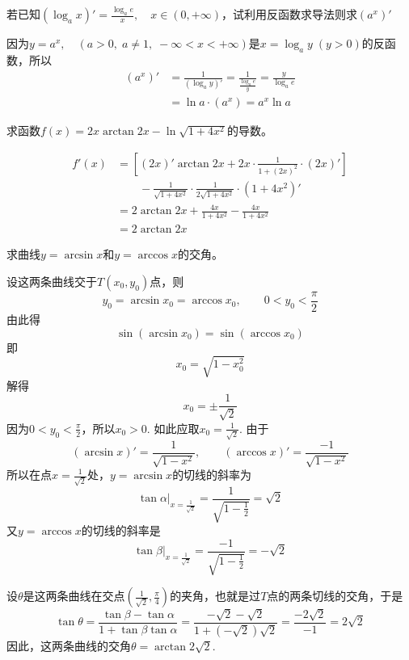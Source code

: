 \begin{example}
若已知$(\log_a x)'=\frac{\log_a e}{x},\quad x\in(0,+\infty)$，试利用反函数求导法则求$(a^x)'$    
\end{example}

\begin{solution}
    因为$y=a^x,\quad (a>0,\; a\ne 1,\; -\infty<x<+\infty)$是$x=\log_a y\; (y>0)$的反函数，所以
\[\begin{split}
    (a^x)'&=\frac{1}{(\log_a y)'}=\frac{1}{\frac{\log_a e}{y}}=\frac{y}{\log_a e}\\
    &=\ln a\cdot (a^x)=a^x\ln a
\end{split}\]
\end{solution}

\begin{example}
求函数$f(x)=2x\arctan 2x-\ln\sqrt{1+4x^2}$的导数。
\end{example}

\begin{solution}
\[\begin{split}
    f'(x)&=\left[(2x)'\arctan 2x+2x\cdot \frac{1}{1+(2x)^2}\cdot (2x)'\right]\\
    &\qquad -\frac{1}{\sqrt{1+4x^2}}\cdot \frac{1}{2\sqrt{1+4x^2}}\cdot (1+4x^2)'\\
    &=2\arctan 2x+\frac{4x}{1+4x^2}-\frac{4x}{1+4x^2}\\
    &=2\arctan 2x
\end{split}\]
\end{solution}


\begin{example}
求曲线$y=\arcsin x$和$y=\arccos x$的交角。
\end{example}

\begin{solution}
设这两条曲线交于$T(x_0,y_0)$点，则
\[y_0=\arcsin x_0=\arccos x_0,\qquad 0<y_0<\frac{\pi}{2}\]
  由此得
\begin{equation}
    \sin(\arcsin x_0)=\sin(\arccos x_0)
\end{equation}  
即
\[x_0=\sqrt{1-x^2_0}\]
解得
\[x_0=\pm\frac{1}{\sqrt{2}}\]
因为$0<y_0<\frac{\pi}{2}$，所以$x_0>0$. 如此应取$x_0=\frac{1}{\sqrt{2}}$. 由于
\[(\arcsin x)'=\frac{1}{\sqrt{1-x^2}},\qquad (\arccos x)'=\frac{-1}{\sqrt{1-x^2}}\]
所以在点$x=\frac{1}{\sqrt{2}}$处，$y=\arcsin x$的切线的斜率为
\[\tan\alpha\Big|_{x=\tfrac{1}{\sqrt{2}}}=\frac{1}{\sqrt{1-\frac{1}{2}}}=\sqrt{2}\]
又$y=\arccos x$的切线的斜率是
\[\tan\beta\Big|_{x=\tfrac{1}{\sqrt{2}}}=\frac{-1}{\sqrt{1-\frac{1}{2}}}=-\sqrt{2}\]

设$\theta$是这两条曲线在交点$\left(\frac{1}{\sqrt{2}},\frac{\pi}{4}\right)$的夹角，也就是过$T$点的两条切线的交角，于是
\[\tan\theta=\frac{\tan\beta-\tan\alpha}{1+\tan\beta\tan\alpha}=\frac{-\sqrt{2}-\sqrt{2}}{1+\left(-\sqrt{2}\right)\sqrt{2}}=\frac{-2\sqrt{2}}{-1}=2\sqrt{2}\]
因此，这两条曲线的交角$\theta=\arctan 2\sqrt{2}$. 
\end{solution}

